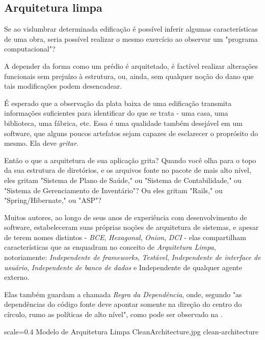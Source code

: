   \subsection{Arquitetura limpa}

    Se ao vislumbrar determinada edificação é possível inferir algumas características de uma obra, seria possível realizar o mesmo exercício ao observar um "programa computacional"?

    A depender da forma como um prédio é arquitetado, é factível realizar alterações funcionais sem prejuízo à estrutura, ou, ainda, sem qualquer noção do dano que tais modificações podem desencadear.

    É esperado que a observação da plata baixa de uma edificação transmita informações suficientes para identificar do que se trata - uma casa, uma biblioteca, uma fábrica, etc. Essa é uma qualidade também desejável em um software, que alguns poucos artefatos sejam capazes de esclarecer o proprósito do mesmo. Ela deve \emph{gritar}.

  \citacaolonga
    {Então o que a arquitetura de sua aplicação grita? Quando você olha para o topo da sua estrutura de diretórios, e os arquivos fonte no pacote de mais alto nível, eles gritam "Sistema de Plano de Saúde," ou "Sistema de Contabilidade," ou "Sistema de Gerenciamento de Inventário"? Ou eles gritam "Rails," ou "Spring/Hibernate," ou "ASP"?}
    {\cite[p. 196, tradução nossa]{Martin2018}}

  Muitos autores, ao longo de seus anos de experiência com desenvolvimento de software, estabeleceram suas próprias noções de arquitetura de sistemas, e apesar de terem nomes distintos - \emph{BCE}\cite{Jacobson1992}, \emph{Hexagonal}\cite{Cockburn2005}, \emph{Onion}\cite{Palermo2008}, \emph{DCI}\cite{Coplien2010} - elas compartilham características que as enquadram no conceito de \emph{Arquitetura Limpa}\cite{Martin2018}, notoriamente: \emph{Independente de frameworks}, \emph{Testável}, \emph{Independente de interface de usuário}, \emph{Independente de banco de dados} e {Independente de qualquer agente externo}.

  Elas também guardam a chamada \emph{Regra da Dependência}, onde, segundo  "as dependências do código fonte deve apontar somente na direção do centro do círculo, rumo as políticas de alto nível", como pode ser observado na .

  \imagem
    {scale=0.4}
    {Modelo de Arquitetura Limpa}
    {CleanArchitecture.jpg}
    {clean-architecture}
    {\cite[p. 197]{Martin2018}}


